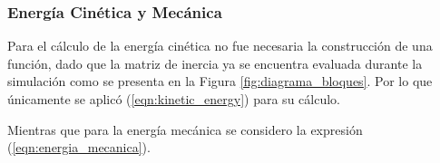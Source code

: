     \subsubsection{Energía Cinética y Mecánica}
    Para el cálculo de la energía cinética no fue necesaria la construcción de una función, dado que la matriz de inercia ya se encuentra evaluada durante la simulación como
    se presenta en la Figura \ref{fig:diagrama_bloques}. Por lo que únicamente se aplicó (\ref{eqn:kinetic_energy}) para su cálculo. 

    Mientras que para la energía mecánica se considero la expresión (\ref{eqn:energia_mecanica}).